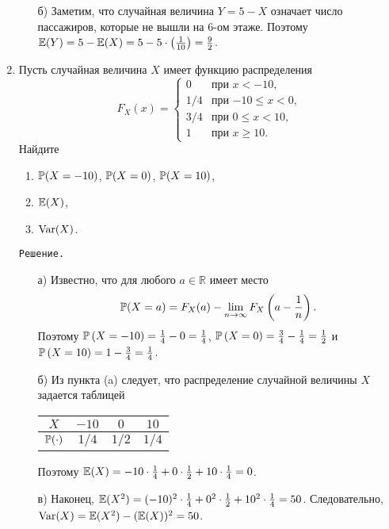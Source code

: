 \begin{enumerate}
\begin{enumerate}
\item[б)] Заметим, что случайная величина $Y = 5 - X$ означает число пассажиров, которые не вышли на 6-ом этаже. Поэтому $\E(Y) = 5 - \E(X) = 5 - 5\cdot\left(\frac{1}{10}\right) = \frac{9}{2}$.
\end{enumerate}
\item Пусть случайная величина $X$ имеет функцию распределения
\[
F_X(x) =          \begin{cases}
                     0     &   \text{при $x < -10$,} \\
                     1/4   &   \text{при $-10 \leq x < 0$,} \\
                     3/4   &   \text{при $0 \leq x < 10$,} \\
                     1     &   \text{при $x \geq 10$.}
                  \end{cases}
\]
Найдите
\begin{enumerate}
  \item $\P(X=-10)$, $\P(X=0)$, $\P(X=10)$,
  \item $\E(X)$,
  \item $\Var(X)$.
\end{enumerate}

\verb"Решение."
\begin{enumerate}
\item[а)] Известно, что для любого $a \in \mathbb{R}$ имеет место
\[
\P(X=a) = F_X(a) - \lim_{n \rightarrow \infty}F_X\left(a-\frac{1}{n}\right) \text{.}
\]
Поэтому $\P\left(X=-10\right) = \frac{1}{4} - 0 = \frac{1}{4}$, $\P\left(X=0\right) = \frac{3}{4} - \frac{1}{4} = \frac{1}{2}$ и $\P\left(X=10\right) = 1 - \frac{3}{4} = \frac{1}{4}$.

\item[б)] Из пункта (a) следует, что распределение случайной величины $X$ задается таблицей
\begin{center}
\begin{tabular}{@{}cccc@{}}
\toprule
$X$         & $-10$ & $0$   & $10$  \\ \midrule
$\P(\cdot)$ & $1/4$ & $1/2$ & $1/4$ \\ \bottomrule
\end{tabular}
\end{center}
Поэтому $\E(X) = -10 \cdot \frac{1}{4} + 0 \cdot \frac{1}{2} + 10 \cdot \frac{1}{4} = 0$.

\item[в)] Наконец, $\E(X^2) = (-10)^2 \cdot \frac{1}{4} + 0^2 \cdot \frac{1}{2} + 10^2 \cdot \frac{1}{4} = 50$. Следовательно, $\Var(X) = \E(X^2) - (\E(X))^2 = 50$.
\end{enumerate}



\end{enumerate}
